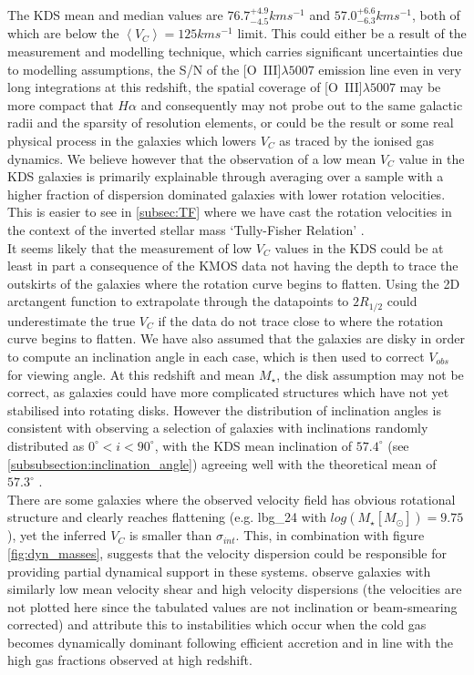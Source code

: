 \documentclass[fleqn,usenatbib]{mn2e}
\begin{document}
The KDS mean and median values are $76.7^{+4.9}_{-4.5}kms^{-1}$ and $57.0^{+6.6}_{-6.3}kms^{-1}$, both of which are below the $\left<V_{C}\right> = 125kms^{-1}$ limit.
This could either be a result of the measurement and modelling technique, which carries significant uncertainties due to modelling assumptions, the S/N of the [O~{\sc III}]$\lambda5007$ emission line even in very long integrations at this redshift, the spatial coverage of [O~{\sc III}]$\lambda5007$ may be more compact that $H\alpha$ and consequently may not probe out to the same galactic radii and the sparsity of resolution elements, or could be the result or some real physical process in the galaxies which lowers $V_{C}$ as traced by the ionised gas dynamics.
We believe however that the observation of a low mean $V_{C}$ value in the KDS galaxies is primarily explainable through averaging over a sample with a higher fraction of dispersion dominated galaxies with lower rotation velocities.
This is easier to see in \cref{subsec:TF} where we have cast the rotation velocities in the context of the inverted stellar mass `Tully-Fisher Relation' \citep[smTFR;][]{Tully1977,Bell2000a}. \\

It seems likely that the measurement of low $V_{C}$ values in the KDS could be at least in part a consequence of the KMOS data not having the depth to trace the outskirts of the galaxies where the rotation curve begins to flatten.
Using the 2D arctangent function to extrapolate through the datapoints to $2R_{1/2}$ could underestimate the true $V_{C}$ if the data do not trace close to where the rotation curve begins to flatten.
We have also assumed that the galaxies are disky in order to compute an inclination angle in each case, which is then used to correct $V_{obs}$ for viewing angle.
At this redshift and mean $M_{\star}$, the disk assumption may not be correct, as galaxies could have more complicated structures which have not yet stabilised into rotating disks.
However the distribution of inclination angles is consistent with observing a selection of galaxies with inclinations randomly distributed as $0^{\circ} < i < 90^{\circ}$, with the KDS mean inclination of $57.4^{\circ}$ (see \cref{subsubsection:inclination_angle}) agreeing well with the theoretical mean of $57.3^{\circ}$ \citep[for a simple derivation of this value see e.g. the appendix in][]{Law2009}. \\

There are some galaxies where the observed velocity field has obvious rotational structure and clearly reaches flattening (e.g. lbg\_24 with $log(M_{\star}[M_{\odot}])=9.75$), yet the inferred $V_{C}$ is smaller than $\sigma_{int}$.
This, in combination with figure \ref{fig:dyn_masses}, suggests that the velocity dispersion could be responsible for providing partial dynamical support in these systems.
\cite{Law2009} observe galaxies with similarly low mean velocity shear and high velocity dispersions (the velocities are not plotted here since the tabulated values are not inclination or beam-smearing corrected) and attribute this to instabilities which occur when the cold gas becomes dynamically dominant following efficient accretion and in line with the high gas fractions observed at high redshift. 
\end{document}
